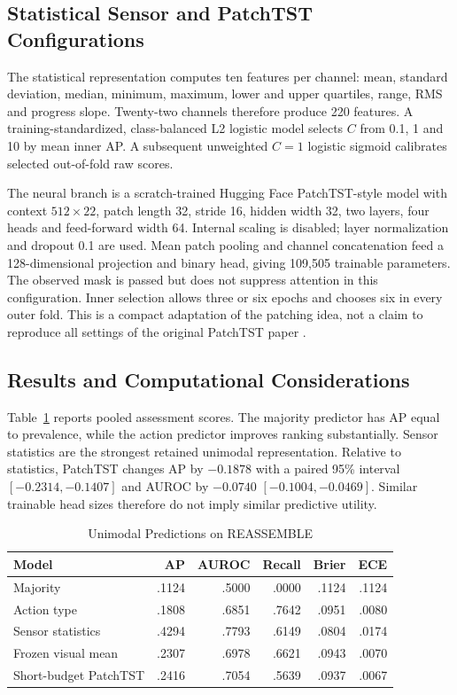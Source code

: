 \subsection{Statistical Sensor and PatchTST Configurations}
The statistical representation computes ten features per channel: mean, standard
deviation, median, minimum, maximum, lower and upper quartiles, range, RMS and progress
slope. Twenty-two channels therefore produce 220 features. A training-standardized,
class-balanced L2 logistic model selects $C$ from 0.1, 1 and 10 by mean inner AP. A
subsequent unweighted $C=1$ logistic sigmoid calibrates selected out-of-fold raw scores.

The neural branch is a scratch-trained Hugging Face PatchTST-style model with context
$512\times22$, patch length 32, stride 16, hidden width 32, two layers, four heads and
feed-forward width 64. Internal scaling is disabled; layer normalization and dropout 0.1
are used. Mean patch pooling and channel concatenation feed a 128-dimensional projection
and binary head, giving 109,505 trainable parameters. The observed mask is passed but
does not suppress attention in this configuration. Inner selection allows three or six
epochs and chooses six in every outer fold. This is a compact adaptation of the patching
idea, not a claim to reproduce all settings of the original PatchTST paper
\parencite{Nie2023PatchTST}.

\subsection{Results and Computational Considerations}
Table~\ref{tab:reassemble-unimodal} reports pooled assessment scores. The majority
predictor has AP equal to prevalence, while the action predictor improves ranking
substantially. Sensor statistics are the strongest retained unimodal representation.
Relative to statistics, PatchTST changes AP by $-0.1878$ with a paired 95\% interval
$[-0.2314,-0.1407]$ and AUROC by $-0.0740$ $[-0.1004,-0.0469]$. Similar trainable head
sizes therefore do not imply similar predictive utility.

\begin{table}[htbp]
\caption{Unimodal Predictions on REASSEMBLE}\label{tab:reassemble-unimodal}
\centering\small

\begin{tabular*}{\linewidth}{@{\extracolsep{\fill}}lrrrrr@{}}\toprule
Model & AP & AUROC & Recall & Brier & ECE\\\midrule
Majority & .1124 & .5000 & .0000 & .1124 & .1124\\
Action type & .1808 & .6851 & .7642 & .0951 & .0080\\
Sensor statistics & .4294 & .7793 & .6149 & .0804 & .0174\\
Frozen visual mean & .2307 & .6978 & .6621 & .0943 & .0070\\
Short-budget PatchTST & .2416 & .7054 & .5639 & .0937 & .0067\\\bottomrule
\end{tabular*}
\end{table}

